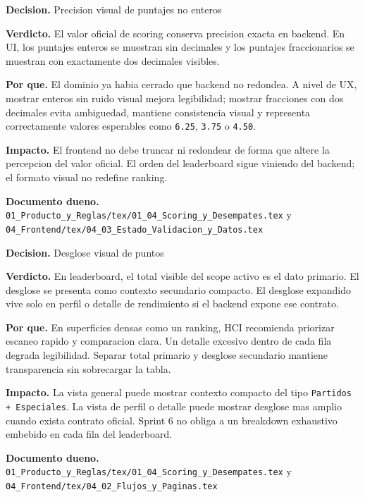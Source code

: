 \begin{docnote}
\textbf{Decision.} Precision visual de puntajes no enteros

\textbf{Verdicto.} El valor oficial de scoring conserva precision exacta en backend. En UI, los puntajes enteros se muestran sin decimales y los puntajes fraccionarios se muestran con exactamente dos decimales visibles.

\textbf{Por que.} El dominio ya habia cerrado que backend no redondea. A nivel de UX, mostrar enteros sin ruido visual mejora legibilidad; mostrar fracciones con dos decimales evita ambiguedad, mantiene consistencia visual y representa correctamente valores esperables como \texttt{6.25}, \texttt{3.75} o \texttt{4.50}.

\textbf{Impacto.} El frontend no debe truncar ni redondear de forma que altere la percepcion del valor oficial. El orden del leaderboard sigue viniendo del backend; el formato visual no redefine ranking.

\textbf{Documento dueno.} \texttt{01\_Producto\_y\_Reglas/tex/01\_04\_Scoring\_y\_Desempates.tex} y \texttt{04\_Frontend/tex/04\_03\_Estado\_Validacion\_y\_Datos.tex}
\end{docnote}

\begin{docnote}
\textbf{Decision.} Desglose visual de puntos

\textbf{Verdicto.} En leaderboard, el total visible del scope activo es el dato primario. El desglose se presenta como contexto secundario compacto. El desglose expandido vive solo en perfil o detalle de rendimiento si el backend expone ese contrato.

\textbf{Por que.} En superficies densas como un ranking, HCI recomienda priorizar escaneo rapido y comparacion clara. Un detalle excesivo dentro de cada fila degrada legibilidad. Separar total primario y desglose secundario mantiene transparencia sin sobrecargar la tabla.

\textbf{Impacto.} La vista general puede mostrar contexto compacto del tipo \texttt{Partidos + Especiales}. La vista de perfil o detalle puede mostrar desglose mas amplio cuando exista contrato oficial. Sprint 6 no obliga a un breakdown exhaustivo embebido en cada fila del leaderboard.

\textbf{Documento dueno.} \texttt{01\_Producto\_y\_Reglas/tex/01\_04\_Scoring\_y\_Desempates.tex} y \texttt{04\_Frontend/tex/04\_02\_Flujos\_y\_Paginas.tex}
\end{docnote}


